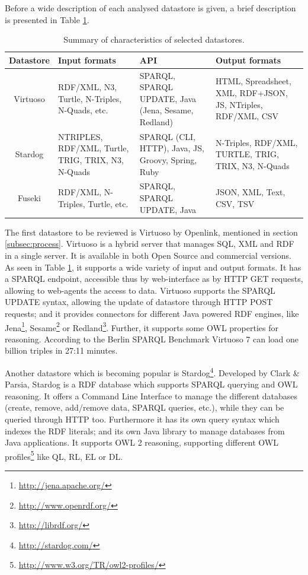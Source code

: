 Before a wide description of each analysed datastore is given, a brief description is presented in Table \ref{tab:datastores}.

\begin{table}
    \center
    \begin{tabular}{|c|p{2.8cm}|p{2.8cm}|p{2.8cm}|}
        \hline
        \textbf{Datastore} & \textbf{Input formats} & \textbf{API} & \textbf{Output formats} \\
        \hline \hline
        Virtuoso & RDF/XML, N3, Turtle, N-Triples, N-Quads, etc. & SPARQL, SPARQL UPDATE, Java (Jena, Sesame, Redland) & HTML, Spreadsheet, XML, RDF+JSON, JS, NTriples, RDF/XML, CSV \\
        \hline
        Stardog & NTRIPLES, RDF/XML, Turtle, TRIG, TRIX, N3, N-Quads & SPARQL (CLI, HTTP), Java, JS, Groovy, Spring, Ruby & N-Triples, RDF/XML, TURTLE, TRIG, TRIX, N3, N-Quads \\
        \hline
        Fuseki & RDF/XML, N-Triples, Turtle, etc. & SPARQL, SPARQL UPDATE, Java & JSON, XML, Text, CSV, TSV \\
        \hline
    \end{tabular}
    \caption{Summary of characteristics of selected datastores.}
    \label{tab:datastores}
\end{table}

The first datastore to be reviewed is Virtuoso by Openlink, mentioned in section \ref{subsec:process}. Virtuoso is a hybrid server that manages SQL, XML and RDF in a single server. It is available in both Open Source and commercial versions. As seen in Table \ref{tab:datastores}, it supports a wide variety of input and output formats. It has a SPARQL endpoint, accessible thus by web-interface as by HTTP GET requests, allowing to web-agents the access to data. Virtuoso supports the SPARQL UPDATE syntax, allowing the update of datastore through HTTP POST requests; and it provides connectors for different Java powered RDF engines, like Jena\footnote{\url{http://jena.apache.org/}}, Sesame\footnote{\url{http://www.openrdf.org/}} or Redland\footnote{\url{http://librdf.org/}}. Further, it supports some OWL properties for reasoning. According to the Berlin SPARQL Benchmark \cite{bizer2009berlin} Virtuoso 7 can load one billion triples in 27:11 minutes.

Another datastore which is becoming popular is Stardog\footnote{\url{http://stardog.com/}}. Developed by Clark \& Parsia, Stardog is a RDF database which supports SPARQL querying and OWL reasoning. It offers a Command Line Interface to manage the different databases (create, remove, add/remove data, SPARQL queries, etc.), while they can be queried through HTTP too. Furthermore it has its own query syntax which indexes the RDF literals; and its own Java library to manage databases from Java applications. It supports OWL 2 reasoning, supporting different OWL profiles\footnote{\url{http://www.w3.org/TR/owl2-profiles/}} like QL, RL, EL or DL.


